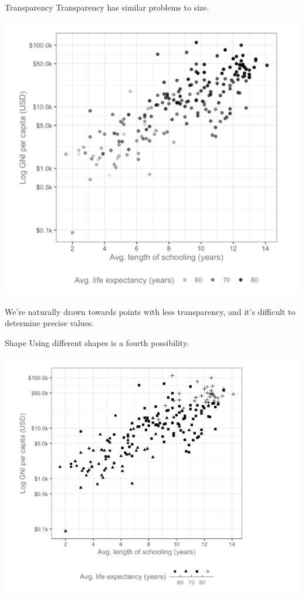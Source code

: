 \documentclass[
  ignorenonframetext,
]{beamer}
\begin{document}
\begin{frame}{Transparency}
\label{transparency}
Transparency has similar problems to size.

\includegraphics{../images/im68.png}

We're naturally drawn towards points with less transparency, and it's
difficult to determine precise values.
\end{frame}

\begin{frame}{Shape}
\label{shape}
Using different shapes is a fourth possibility.

\includegraphics{../images/m69.png}
\end{frame}
\end{document}
